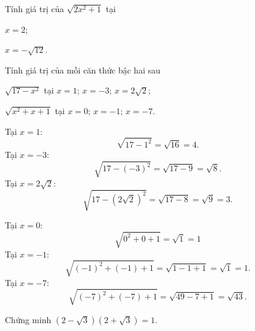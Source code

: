 \begin{bt}
	Tính giá trị của $\sqrt{2x^2+1}$ tại 
	\begin{listEX}[2]
	\item $x=2$;
	\item $x=-\sqrt{12}$.
	\end{listEX}
\end{bt}
\begin{bt}
	Tính giá trị của mỗi căn thức bậc hai sau
	\begin{listEX}[2]
	\item $\sqrt{17-x^2}$ tại $x=1$; $x=-3$; $x=2\sqrt{2}$;
	\item $\sqrt{x^2+x+1}$ tại $x=0$; $x=-1$; $x=-7$.
	\end{listEX}
	\loigiai
	{
	\begin{listEX}
	\item Tại $x=1$:
	\[\sqrt{17-1^2} = \sqrt{16} = 4.\]
	Tại $x=-3$:
	\[\sqrt{17-(-3)^2} = \sqrt{17-9} = \sqrt{8}.\]
	Tại $x=2\sqrt{2}$:
	\[\sqrt{17-(2\sqrt{2})^2} = \sqrt{17-8} = \sqrt{9} = 3.\]
	\item Tại $x=0$:
	\[\sqrt{0^2+0+1} = \sqrt{1} = 1\]
	Tại $x=-1$:\[\sqrt{(-1)^2+(-1)+1} = \sqrt{1-1+1} = \sqrt{1} = 1.\]
	Tại $x=-7$:\[\sqrt{(-7)^2+(-7)+1} = \sqrt{49-7+1} = \sqrt{43}
	.\]
	\end{listEX}
	}
\end{bt}
\begin{bt}
	Chứng minh $(2-\sqrt{3})(2+\sqrt{3})=1$.
\end{bt}

